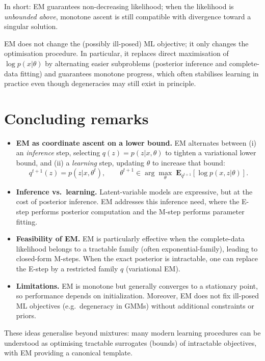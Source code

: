 \noindent
In short: EM guarantees non-decreasing likelihood; when the likelihood is \emph{unbounded above},
monotone ascent is still compatible with divergence toward a singular solution.

\begin{remark}
EM does not change the (possibly ill-posed) ML objective; it only changes the optimisation procedure.
In particular, it replaces direct maximisation of $\log p(x| \theta)$ by alternating easier subproblems (posterior inference and complete-data fitting) and guarantees monotone progress, which often stabilises learning in practice even though degeneracies may still exist in principle.
\end{remark}


\section{Concluding remarks}

\begin{itemize}
\item \textbf{EM as coordinate ascent on a lower bound.}
      EM alternates between (i) an \emph{inference} step, selecting
      $q(z)=p(z| x,\theta)$ to tighten a variational lower bound, and
      (ii) a \emph{learning} step, updating $\theta$ to increase that bound:
      \[
      q^{t+1}(z)=p(z| x,\theta^t),
      \qquad
      \theta^{t+1}\in\arg\max_{\theta}\; \mathbf{E}_{q^{t+1}}[\log p(x,z| \theta)].
      \]
\item \textbf{Inference vs.\ learning.}
      Latent-variable models are expressive, but at the cost of posterior inference.
      EM addresses this inference need, where the E-step performs posterior computation and the M-step performs parameter fitting.
\item \textbf{Feasibility of EM.}
      EM is particularly effective when the complete-data likelihood belongs to a tractable family (often exponential-family),
      leading to closed-form M-steps. 
      When the exact posterior is intractable, one can replace the E-step by a restricted family $q$ (variational EM).
\item \textbf{Limitations.}
      EM is monotone but generally converges to a stationary point, so performance depends on initialization.
      Moreover, EM does not fix ill-posed ML objectives (e.g.\ degeneracy in GMMs) without additional constraints or priors.
\end{itemize}

\noindent
These ideas generalise beyond mixtures: many modern learning procedures can be understood as
optimising tractable surrogates (bounds) of intractable objectives, with EM providing a canonical template.


